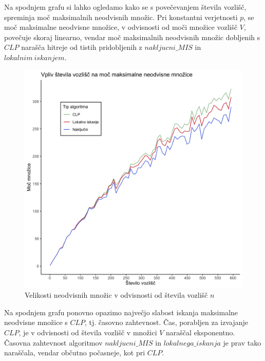 \documentclass[a4paper, 12pt]{article}
\begin{document}
\noindent Na spodnjem grafu si lahko ogledamo kako se s povečevanjem števila vozlišč, spreminja moč maksimalnih neodvisnih množic. Pri konstantni verjetnosti $p$, se moč maksimalne neodvisne množice, v odvisnosti od 
moči množice vozlišč $V$, povečuje skoraj linearno, vendar moč maksimalnih neodvisnih množic dobljenih s $CLP$ narašča hitreje od tistih pridobljenih z $nakljucni\_MIS$ in
$lokalnim\ iskanjem$.


\begin{figure}[h!]
	\begin{center}
		\includegraphics[scale=0.11]{R_koda/voz-moc.png}
		\caption{Velikosti neodvisnih množic v odvisnosti od števila vozlišč $n$}
	\end{center}
\end{figure}

\noindent Na spodnjem grafu ponovno opazimo največjo slabost iskanja maksimalne neodvisne množice s $CLP$, tj. časovno zahtevnost. Čas, porabljen za izvajanje $CLP$, je v odvisnosti od števila vozlišč v množici $V$
naraščal eksponentno. Časovna zahtevnost algoritmov $nakljucni\_MIS$ in $lokalnega\_iskanja$ je prav tako naraščala, vendar občutno počasneje, kot pri $CLP$.
\end{document}
